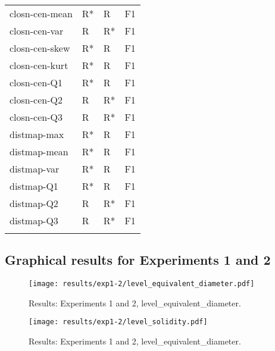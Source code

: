 \begin{longtable}{llll}
		closn-cen-mean                &     R* &    R &    F1 \\
		closn-cen-var                 &      R &   R* &    F1 \\
		closn-cen-skew                &     R* &    R &    F1 \\
		closn-cen-kurt                &     R* &    R &    F1 \\
		closn-cen-Q1                  &     R* &    R &    F1 \\
		closn-cen-Q2                  &      R &   R* &    F1 \\
		closn-cen-Q3                  &      R &   R* &    F1 \\
		distmap-max                   &     R* &    R &    F1 \\
		distmap-mean                  &     R* &    R &    F1 \\
		distmap-var                   &     R* &    R &    F1 \\
		distmap-Q1                    &     R* &    R &    F1 \\
		distmap-Q2                    &      R &   R* &    F1 \\
		distmap-Q3                    &      R &   R* &    F1 \\
		\label{tab:results-other-features}
	\end{longtable}
\subsection{Graphical results for Experiments 1 and 2}
\begin{figure}[ht] 
	\label{fig:results-input-feats} 
	\begin{minipage}[b]{0.5\linewidth}
		\centering
		\texttt{[image: results/exp1-2/level\_equivalent\_diameter.pdf]} 
		\caption[Results: Experiments 1 and 2, level\_equivalent\_diameter]{Results: Experiments 1 and 2, level\_equivalent\_diameter.} 
		\vspace{4ex}
	\end{minipage}%
	\begin{minipage}[b]{0.5\linewidth}
		\centering
		\texttt{[image: results/exp1-2/level\_solidity.pdf]} 
		\caption[Results: Experiments 1 and 2, level\_equivalent\_diameter]{Results: Experiments 1 and 2, level\_equivalent\_diameter.} 
		\vspace{4ex}
	\end{minipage} 
\end{figure}

